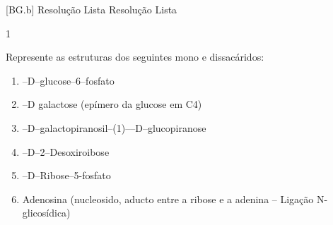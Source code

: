 \documentclass[\mainfilename]{subfiles}
\begin{document}
[BG.b]
{Resolução Lista}
{Resolução Lista}

\begin{questionBox}1{}
    
    Represente as estruturas dos seguintes mono e dissacáridos:
    \begin{enumerate}[label=\alph*)]
        \item \beta--D--glucose--6--fosfato
        \item \alpha--D galactose (epímero da glucose em C4)
        \item \beta--D--galactopiranosil--(1)--\alpha--D--glucopiranose
        \item \beta--D--2--Desoxiroibose
        \item \beta--D--Ribose--5-fosfato
        \item Adenosina (nucleosido, aducto entre a ribose e a adenina -- Ligação N-glicosídica)
    \end{enumerate}

    
\end{questionBox}
\end{document}
